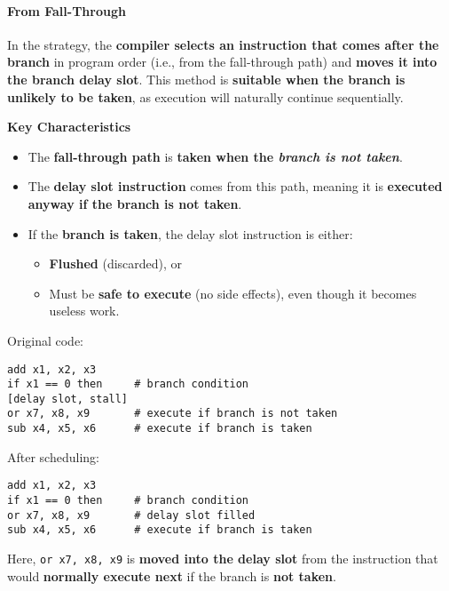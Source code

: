 \paragraph{From Fall-Through}\label{paragraph: From Fall-Through}

In the  strategy, the \textbf{compiler selects an instruction that comes after the branch} in program order (i.e., from the fall-through path) and \textbf{moves it into the branch delay slot}. This method is \textbf{suitable when the branch is unlikely to be taken}, as execution will naturally continue sequentially.

\highspace
\begin{flushleft}
    \textcolor{Green3}{ \textbf{Key Characteristics}}
\end{flushleft}
\begin{itemize}
    \item The \textbf{fall-through path} is \textbf{taken when the \emph{branch is not taken}}.
    \item The \textbf{delay slot instruction} comes from this path, meaning it is \textbf{executed anyway if the branch is not taken}.
    \item If the \textbf{branch is taken}, the delay slot instruction is either:
    \begin{itemize}
        \item \textbf{Flushed} (discarded), or
        \item Must be \textbf{safe to execute} (no side effects), even though it becomes useless work.
    \end{itemize}
\end{itemize}

\begin{examplebox}
    Original code:
    \begin{lstlisting}[language=riscv]
add x1, x2, x3
if x1 == 0 then     # branch condition
[delay slot, stall]
or x7, x8, x9       # execute if branch is not taken
sub x4, x5, x6      # execute if branch is taken\end{lstlisting}
    After scheduling:
    \begin{lstlisting}[language=riscv]
add x1, x2, x3
if x1 == 0 then     # branch condition
or x7, x8, x9       # delay slot filled
sub x4, x5, x6      # execute if branch is taken\end{lstlisting}
    Here, \texttt{or x7, x8, x9} is \textbf{moved into the delay slot} from the instruction that would \textbf{normally execute next} if the branch is \textbf{not taken}.
\end{examplebox}

